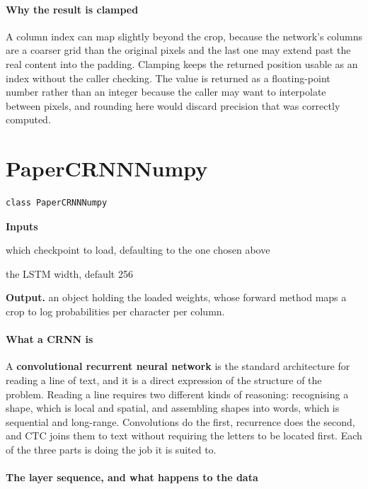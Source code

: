 \paragraph{Why the result is clamped}
A column index can map slightly beyond the crop, because the network's columns are a coarser grid than the original pixels and the last one may extend past the real content into the padding. Clamping keeps the returned position usable as an index without the caller checking. The value is returned as a floating-point number rather than an integer because the caller may want to interpolate between pixels, and rounding here would discard precision that was correctly computed.


\section{PaperCRNNNumpy}
\begin{lstlisting}[style=sig]
class PaperCRNNNumpy
\end{lstlisting}

\noindent\textbf{Inputs}
\begin{description}[leftmargin=2.2em,style=nextline,font=\normalfont\ttfamily]\setlength\itemsep{1pt}
  \item[{checkpointPath}] \normalfont which checkpoint to load, defaulting to the one chosen above
  \item[{hiddenSize}] \normalfont the LSTM width, default 256
\end{description}

\noindent\textbf{Output.} an object holding the loaded weights, whose forward method maps a crop to log probabilities per character per column.


\paragraph{What a CRNN is}
A \textbf{convolutional recurrent neural network} \cite{shi2017} is the standard architecture for reading a line of text, and it is a direct expression of the structure of the problem. Reading a line requires two different kinds of reasoning: recognising a shape, which is local and spatial, and assembling shapes into words, which is sequential and long-range. Convolutions do the first, recurrence does the second, and CTC joins them to text without requiring the letters to be located first. Each of the three parts is doing the job it is suited to.


\paragraph{The layer sequence, and what happens to the data}

